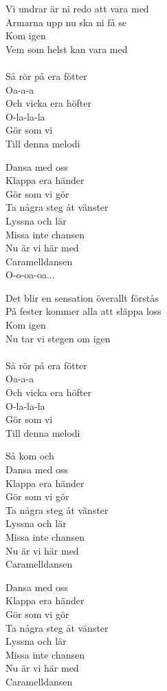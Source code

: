 \vspace{10pt}
Vi undrar är ni redo att vara med\\
Armarna upp nu ska ni få se\\
Kom igen\\
Vem som helst kan vara med\\
\\
Så rör på era fötter\\
Oa-a-a\\
Och vicka era höfter\\
O-la-la-la\\
Gör som vi\\
Till denna melodi\par
\vspace{10pt}
Dansa med oss\\
Klappa era händer\\
Gör som vi gör\\
Ta några steg åt vänster\\
Lyssna och lär\\
Missa inte chansen\\
Nu är vi här med\\
Caramelldansen\\
O-o-oa-oa...\par
\vspace{10pt}
Det blir en sensation överallt förstås\\
På fester kommer alla att släppa loss\\
Kom igen\\
Nu tar vi stegen om igen\\
\\
Så rör på era fötter\\
Oa-a-a\\
Och vicka era höfter\\
O-la-la-la\\
Gör som vi\\
Till denna melodi\par
\vspace{10pt}
\revrpt Så kom och\\
Dansa med oss\\
Klappa era händer\\
Gör som vi gör\\
Ta några steg åt vänster\\
Lyssna och lär\\
Missa inte chansen\\
Nu är vi här med\\
Caramelldansen\par
\vspace{10pt}
Dansa med oss\\
Klappa era händer\\
Gör som vi gör\\
Ta några steg åt vänster\\
Lyssna och lär\\
Missa inte chansen\\
Nu är vi här med\\
Caramelldansen\rpt
